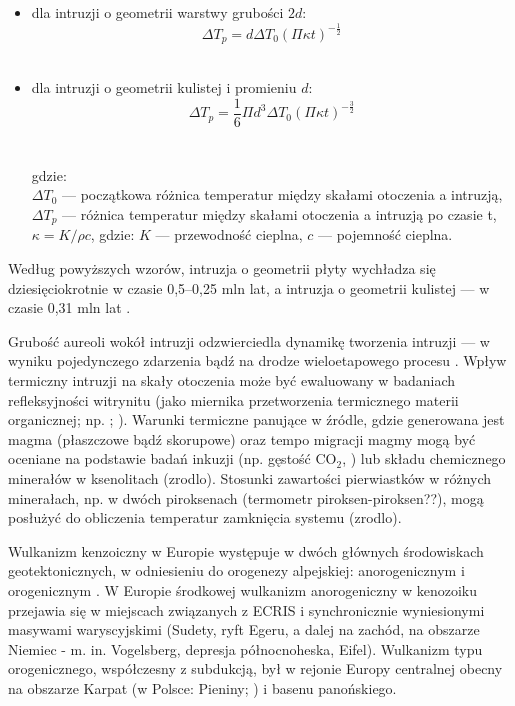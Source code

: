 \documentclass[11.5pt,twoside]{report}
\newcommand{\ct}[1]{\ignorespaces} %
\begin{document}
 \begin{itemize}
 	\item dla intruzji o geometrii warstwy grubości \(2d\): \\
 	\[\Delta T_{p} = d \Delta T_{0}{(\Pi\kappa{t})}^{-\frac{1}{2}}\] \\
 	
 	\item dla intruzji o geometrii kulistej i promieniu \(d\):
 	\[\Delta T_{p} = \frac{1}{6}\Pi{d^{3}}{\Delta T_{0}}{(\Pi \kappa{t})}^{-\frac{3}{2}}\]\\
 	\\
 	gdzie: \\
 	\(\Delta T_{0}\) --- początkowa różnica temperatur między skałami otoczenia a intruzją, \\
 	\(\Delta T_{p}\) --- różnica temperatur między skałami otoczenia a intruzją po czasie t, \\
 	\(\kappa = K/\rho{c}\), gdzie: \(K\) --- przewodność cieplna, \(c\) --- pojemność cieplna.
\end{itemize}
 
\noindent Według powyższych wzorów, intruzja o geometrii płyty wychładza się dziesięciokrotnie w czasie 0,5--0,25 mln lat, a intruzja o geometrii kulistej --- w czasie 0,31 mln lat \parencite{Majorowicz.1975}.	
 
 Grubość aureoli wokół intruzji odzwierciedla dynamikę tworzenia intruzji --- w wyniku pojedynczego zdarzenia bąd\'{z} na drodze wieloetapowego procesu \parencite{Galushkin.1997}. Wpływ termiczny intruzji na skały otoczenia może być ewaluowany w badaniach refleksyjności witrynitu (jako miernika przetworzenia termicznego materii organicznej; np. \cite{Annen.2017}; \cite{Fjeldskaar.2008}). Warunki termiczne panujące w \'{z}ródle, gdzie generowana jest magma (płaszczowe bąd\'{z} skorupowe) oraz tempo migracji magmy mogą być oceniane na podstawie badań inkuzji (np. gęstość CO$_{2}$, \cite{Ladenberger.2009}) lub składu chemicznego minerałów w ksenolitach (zrodlo). Stosunki zawartości pierwiastków w różnych minerałach, np. w dwóch piroksenach (termometr piroksen-piroksen??), mogą posłużyć do obliczenia temperatur zamknięcia systemu (zrodlo). \ct{wszędzie powt. "mogą"}
 
 Wulkanizm kenzoiczny w Europie występuje w dwóch głównych środowiskach geotektonicznych, w odniesieniu do orogenezy alpejskiej: anorogenicznym i orogenicznym \parencite{Wilson.2006}. W Europie środkowej wulkanizm anorogeniczny w kenozoiku przejawia się w miejscach związanych z ECRIS i synchronicznie wyniesionymi masywami waryscyjskimi (Sudety, ryft Egeru, a dalej na zachód, na obszarze Niemiec - m. in. Vogelsberg, depresja północnoheska, Eifel). Wulkanizm typu orogenicznego, współczesny z subdukcją, był w rejonie Europy centralnej obecny na obszarze Karpat (w Polsce: Pieniny; \cite{Badura.2004}) i basenu panońskiego. 
 
\end{document}
